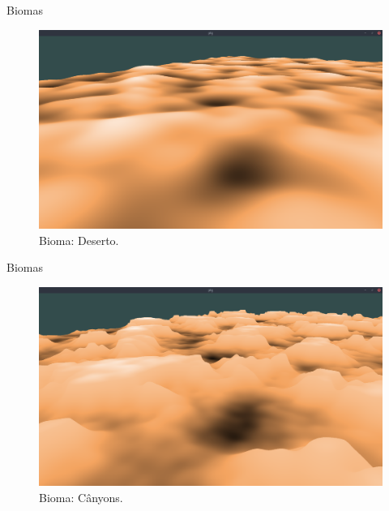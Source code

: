 \begin{frame}{Biomas}
    \begin{figure}[H]
        \centering
        \includegraphics[width=.9\textwidth]{img/biomas/bssDesert.png}
        \caption{Bioma: Deserto.}
        \label{fig:img_biomas_bssDesert}
    \end{figure}
    
    
\end{frame}

\begin{frame}{Biomas}
    \begin{figure}[H]
        \centering
        \includegraphics[width=.9\textwidth]{img/biomas/bssCanyons.png}
        \caption{Bioma: Cânyons.}
        \label{fig:img_biomas_bssCanyons}
    \end{figure}
    
    
\end{frame}